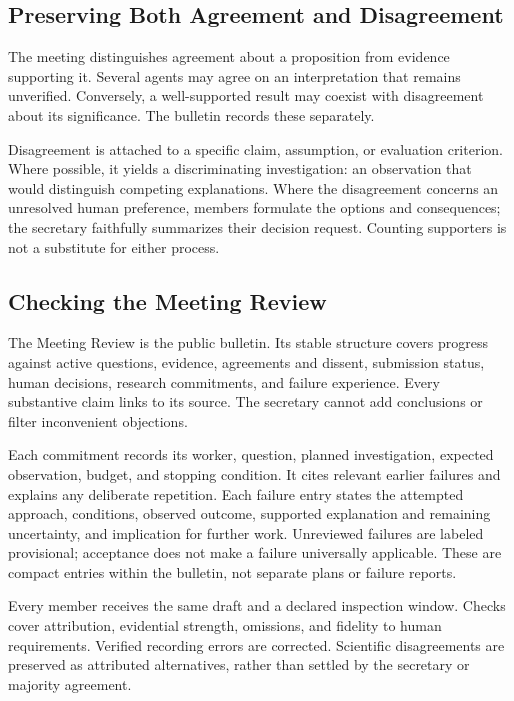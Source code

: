 \documentclass[11pt]{article}
\begin{document}
\subsection{Preserving Both Agreement and Disagreement}

The meeting distinguishes agreement about a proposition from evidence supporting it. Several agents may agree on an interpretation that remains unverified. Conversely, a well-supported result may coexist with disagreement about its significance. The bulletin records these separately.

Disagreement is attached to a specific claim, assumption, or evaluation criterion. Where possible, it yields a discriminating investigation: an observation that would distinguish competing explanations. Where the disagreement concerns an unresolved human preference, members formulate the options and consequences; the secretary faithfully summarizes their decision request. Counting supporters is not a substitute for either process.

\subsection{Checking the Meeting Review}

The Meeting Review is the public bulletin. Its stable structure covers progress against active questions, evidence, agreements and dissent, submission status, human decisions, research commitments, and failure experience. Every substantive claim links to its source. The secretary cannot add conclusions or filter inconvenient objections.

Each commitment records its worker, question, planned investigation, expected observation, budget, and stopping condition. It cites relevant earlier failures and explains any deliberate repetition. Each failure entry states the attempted approach, conditions, observed outcome, supported explanation and remaining uncertainty, and implication for further work. Unreviewed failures are labeled provisional; acceptance does not make a failure universally applicable. These are compact entries within the bulletin, not separate plans or failure reports.

Every member receives the same draft and a declared inspection window. Checks cover attribution, evidential strength, omissions, and fidelity to human requirements. Verified recording errors are corrected. Scientific disagreements are preserved as attributed alternatives, rather than settled by the secretary or majority agreement.
\end{document}
